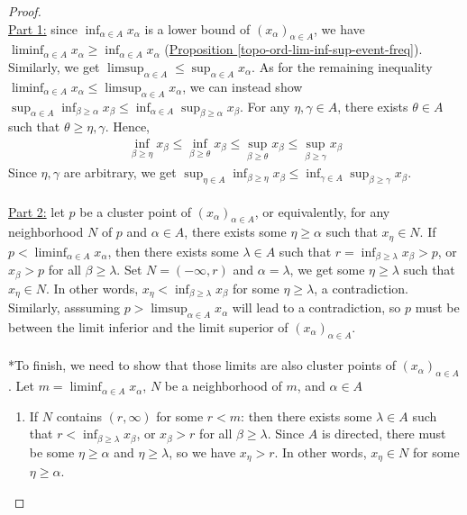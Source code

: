 \documentclass{treatise}
\begin{document}
\begin{proof} \ \\
\underline{Part 1:} since $\inf_{\alpha \in A} x_\alpha$ is a lower bound of $(x_\alpha)_{\alpha \in A}$, we have $\liminf_{\alpha \in A} x_\alpha \geq \inf_{\alpha \in A} x_\alpha$ (\hyperref[topo-ord-lim-inf-sup-event-freq]{Proposition \ref*{topo-ord-lim-inf-sup-event-freq}}). Similarly, we get $\limsup_{\alpha \in A} \leq \sup_{\alpha \in A} x_\alpha$. As for the remaining inequality $\liminf_{\alpha \in A} x_\alpha \leq \limsup_{\alpha \in A} x_\alpha$, we can instead show $\sup_{\alpha \in A} \inf_{\beta \geq \alpha} x_\beta \leq \inf_{\alpha \in A} \sup_{\beta \geq \alpha} x_\beta$. For any $\eta, \gamma \in A$, there exists $\theta \in A$ such that $\theta \geq \eta, \gamma$. Hence,
\begin{align*}
    \inf_{\beta \geq \eta} x_\beta \leq \inf_{\beta \geq \theta} x_\beta \leq \sup_{\beta \geq \theta} x_\beta \leq \sup_{\beta \geq \gamma} x_\beta
\end{align*}
Since $\eta, \gamma$ are arbitrary, we get $\sup_{\eta \in A} \inf_{\beta \geq \eta} x_\beta \leq \inf_{\gamma \in A} \sup_{\beta \geq \gamma} x_\beta$.
\\
\\
\underline{Part 2:} let $p$ be a cluster point of $(x_\alpha)_{\alpha \in A}$, or equivalently, for any neighborhood $N$ of $p$ and $\alpha \in A$, there exists some $\eta \geq \alpha$ such that $x_\eta \in N$. If $p < \liminf_{\alpha \in A} x_\alpha$, then there exists some $\lambda \in A$ such that $r = \inf_{\beta \geq \lambda} x_\beta > p$, or $x_\beta > p$ for all $\beta \geq \lambda$. Set $N = (-\infty, r)$ and $\alpha = \lambda$, we get some $\eta \geq \lambda$ such that $x_\eta \in N$. In other words, $x_\eta < \inf_{\beta \geq \lambda} x_\beta$ for some $\eta \geq \lambda$, a contradiction. Similarly, asssuming $p > \limsup_{\alpha \in A} x_\alpha$ will lead to a contradiction, so $p$ must be between the limit inferior and the limit superior of $(x_\alpha)_{\alpha \in A}$.
\\
\\
*To finish, we need to show that those limits are also cluster points of $(x_\alpha)_{\alpha \in A}$. Let $m = \liminf_{\alpha \in A} x_\alpha$, $N$ be a neighborhood of $m$, and $\alpha \in A$
\begin{enumerate}
    \item If $N$ contains $(r, \infty)$ for some $r < m$: then there exists some $\lambda \in A$ such that $r < \inf_{\beta \geq \lambda} x_\beta$, or $x_\beta > r$ for all $\beta \geq \lambda$. Since $A$ is directed, there must be some $\eta \geq \alpha$ and $\eta \geq \lambda$, so we have $x_\eta > r$. In other words, $x_\eta \in N$ for some $\eta \geq \alpha$.

\end{enumerate}
\end{proof}
\end{document}
